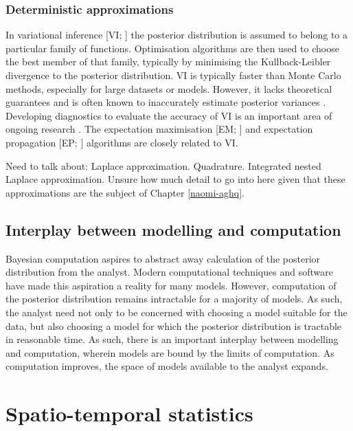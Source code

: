 \documentclass[a4paper, nobind]{templates/ociamthesis}
\begin{document}
\hypertarget{deterministic-approximations}{%
\subsubsection{Deterministic approximations}\label{deterministic-approximations}}

In variational inference {[}VI; \textcite{blei2017variational}{]} the posterior distribution is assumed to belong to a particular family of functions.
Optimisation algorithms are then used to choose the best member of that family, typically by minimising the Kullback-Leibler divergence to the posterior distribution.
VI is typically faster than Monte Carlo methods, especially for large datasets or models.
However, it lacks theoretical guarantees and is often known to inaccurately estimate posterior variances \autocite{giordano2018covariances}.
Developing diagnostics to evaluate the accuracy of VI is an important area of ongoing research \autocite{yao2018yes}.
The expectation maximisation {[}EM; \textcite{dempster1977maximum}{]} and expectation propagation {[}EP; \textcite{minka2001expectation}{]} algorithms are closely related to VI.

Need to talk about:
Laplace approximation.
Quadrature.
Integrated nested Laplace approximation.
Unsure how much detail to go into here given that these approximations are the subject of Chapter \ref{naomi-aghq}.

\hypertarget{interplay-between-modelling-and-computation}{%
\subsection{Interplay between modelling and computation}\label{interplay-between-modelling-and-computation}}

Bayesian computation aspires to abstract away calculation of the posterior distribution from the analyst.
Modern computational techniques and software have made this aspiration a reality for many models.
However, computation of the posterior distribution remains intractable for a majority of models.
As such, the analyst need not only to be concerned with choosing a model suitable for the data, but also choosing a model for which the posterior distribution is tractable in reasonable time.
As such, there is an important interplay between modelling and computation, wherein models are bound by the limits of computation.
As computation improves, the space of models available to the analyst expands.

\hypertarget{spatio-temporal-statistics}{%
\section{Spatio-temporal statistics}\label{spatio-temporal-statistics}}
\end{document}
